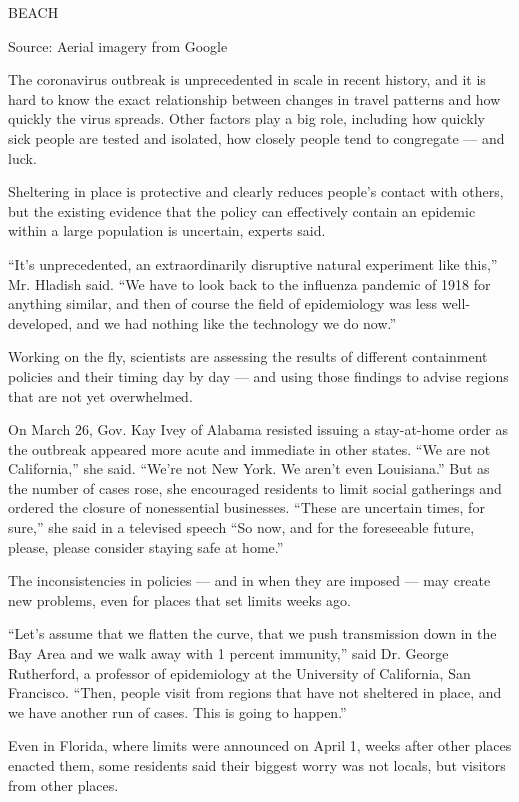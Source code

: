 BEACH

Source: Aerial imagery from Google

The coronavirus outbreak is unprecedented in scale in recent history,
and it is hard to know the exact relationship between changes in travel
patterns and how quickly the virus spreads. Other factors play a big
role, including how quickly sick people are tested and isolated, how
closely people tend to congregate --- and luck.

Sheltering in place is protective and clearly reduces people's contact
with others, but the existing evidence that the policy can effectively
contain an epidemic within a large population is uncertain, experts
said.

``It's unprecedented, an extraordinarily disruptive natural experiment
like this,'' Mr. Hladish said. ``We have to look back to the influenza
pandemic of 1918 for anything similar, and then of course the field of
epidemiology was less well-developed, and we had nothing like the
technology we do now.''

Working on the fly, scientists are assessing the results of different
containment policies and their timing day by day --- and using those
findings to advise regions that are not yet overwhelmed.

On March 26, Gov. Kay Ivey of Alabama resisted issuing a stay-at-home
order as the outbreak appeared more acute and immediate in other states.
``We are not California,'' she said. ``We're not New York. We aren't
even Louisiana.'' But as the number of cases rose, she encouraged
residents to limit social gatherings and ordered the closure of
nonessential businesses. ``These are uncertain times, for sure,'' she
said in a televised speech ``So now, and for the foreseeable future,
please, please consider staying safe at home.''

The inconsistencies in policies --- and in when they are imposed --- may
create new problems, even for places that set limits weeks ago.

``Let's assume that we flatten the curve, that we push transmission down
in the Bay Area and we walk away with 1 percent immunity,'' said Dr.
George Rutherford, a professor of epidemiology at the University of
California, San Francisco. ``Then, people visit from regions that have
not sheltered in place, and we have another run of cases. This is going
to happen.''

Even in Florida, where limits were announced on April 1, weeks after
other places enacted them, some residents said their biggest worry was
not locals, but visitors from other places.

